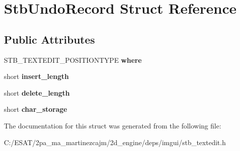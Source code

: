 \hypertarget{struct_stb_undo_record}{}\section{Stb\+Undo\+Record Struct Reference}
\label{struct_stb_undo_record}
\subsection*{Public Attributes}
\begin{DoxyCompactItemize}
\item 
\mbox{\label{struct_stb_undo_record_a49e87adbb75a18ffba1f853ac974b31d}} 
S\+T\+B\+\_\+\+T\+E\+X\+T\+E\+D\+I\+T\+\_\+\+P\+O\+S\+I\+T\+I\+O\+N\+T\+Y\+PE {\bfseries where}
\item 
\mbox{\label{struct_stb_undo_record_ae2a3af79db791549db0c42263407cab5}} 
short {\bfseries insert\+\_\+length}
\item 
\mbox{\label{struct_stb_undo_record_ad81789175cef417a0fe58204277fd735}} 
short {\bfseries delete\+\_\+length}
\item 
\mbox{\label{struct_stb_undo_record_a654ca22cb5021a8ee18ad5f500eb406d}} 
short {\bfseries char\+\_\+storage}
\end{DoxyCompactItemize}


The documentation for this struct was generated from the following file\+:\begin{DoxyCompactItemize}
\item 
C\+:/\+E\+S\+A\+T/2pa\+\_\+ma\+\_\+martinezcajm/2d\+\_\+engine/deps/imgui/stb\+\_\+textedit.\+h\end{DoxyCompactItemize}
